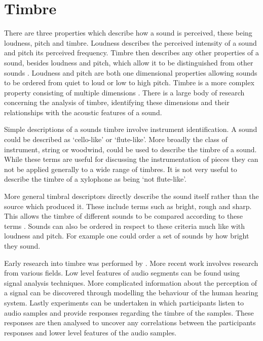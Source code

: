 
\chapter{Timbre}
\label{chap:Timbre}
	There are three properties which describe how a sound is perceived, these being loudness, pitch and timbre. Loudness
	describes the perceived intensity of a sound and pitch its perceived frequency. Timbre then describes any other
	properties of a sound, besides loudness and pitch, which allow it to be distinguished from other sounds
	\citep{mathews1999introduction}. Loudness and pitch are both one dimensional properties allowing sounds to be
	ordered from quiet to loud or low to high pitch. Timbre is a more complex property consisting of multiple dimensions
	\citep{rossing2002the}. There is a large body of research concerning the analysis of timbre, identifying these
	dimensions and their relationships with the acoustic features of a sound.

	Simple descriptions of a sounds timbre involve instrument identification. A sound could be described as `cello-like'
	or `flute-like'. More broadly the class of instrument, string or woodwind, could be used to describe the timbre of a
	sound. While these terms are useful for discussing the instrumentation of pieces they can not be applied generally
	to a wide range of timbres. It is not very useful to describe the timbre of a xylophone as being `not flute-like'.

	More general timbral descriptors directly describe the sound itself rather than the source which produced it. These
	include terms such as bright, rough and sharp. This allows the timbre of different sounds to be compared according
	to these terms \citep{howard2009acoustics}. Sounds can also be ordered in respect to these criteria much like with
	loudness and pitch. For example one could order a set of sounds by how bright they sound.

	Early research into timbre was performed by \citet{helmholtz1875on}. More recent work involves research from various
	fields. Low level features of audio segments can be found using signal analysis techniques. More complicated
	information about the perception of a signal can be discovered through modelling the behaviour of the human hearing
	system. Lastly experiments can be undertaken in which participants listen to audio samples and provide responses
	regarding the timbre of the samples. These responses are then analysed to uncover any correlations between the
	participants responses and lower level features of the audio samples.

